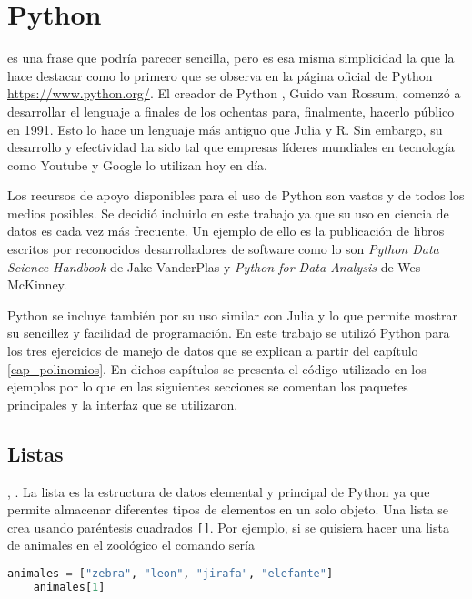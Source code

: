 \chapter{Python}

 es una frase que podría parecer sencilla, pero es esa misma simplicidad la que la hace destacar como lo primero que se observa en la página oficial de \textsf{Python} \url{https://www.python.org/}. El creador de \textsf{Python} , Guido van Rossum, comenzó a desarrollar el lenguaje a finales de los ochentas para, finalmente, hacerlo público en 1991. Esto lo hace un lenguaje más antiguo que \textsf{Julia} y \textsf{R}. Sin embargo, su desarrollo y efectividad ha sido tal que empresas líderes mundiales en tecnología como Youtube y Google lo utilizan hoy en día. 

Los recursos de apoyo disponibles para el uso de \textsf{Python} son vastos y de todos los medios posibles. Se decidió incluirlo en este trabajo ya que su uso en ciencia de datos es cada vez más frecuente. Un ejemplo de ello es la publicación de libros escritos por reconocidos desarrolladores de software como lo son \textit{Python Data Science Handbook} de Jake VanderPlas y \textit{Python for Data Analysis} de Wes McKinney. 

\textsf{Python} se incluye también por su uso similar con \textsf{Julia} y  lo que permite mostrar su sencillez y facilidad de programación. En este trabajo se utilizó \textsf{Python} para los tres ejercicios de manejo de datos que se explican a partir del capítulo \ref{cap_polinomios}. En dichos capítulos se presenta el código utilizado en los ejemplos por lo que en las siguientes secciones se comentan los paquetes principales y la interfaz que se utilizaron. 

\section{Listas}
, \cite{matthes2019python}. La lista es la estructura de datos elemental y principal de \textsf{Python} ya que permite almacenar diferentes tipos de elementos en un solo objeto. Una lista se crea usando paréntesis cuadrados \texttt{[]}. Por ejemplo, si se quisiera hacer una lista de animales en el zoológico el comando sería 

\begin{lstlisting}[language=Python]
	animales = ["zebra", "leon", "jirafa", "elefante"]
	animales[1]
\end{lstlisting}

